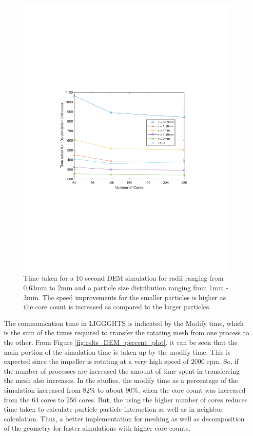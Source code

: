 \documentclass[preprint,11pt,authoryear]{elsarticle}
\begin{document}
\begin{figure}
\centering
\includegraphics[scale=0.85]{rslsts_DEM_alldia_timing_mtlb.pdf}
\caption{ Time taken for a 10 second DEM simulation for radii ranging from
 0.63mm to 2mm and a particle size distribution ranging from 1mm - 3mm. The speed improvements 
 for the smaller particles is higher as the core count is increased as compared to the larger particles.}
\label{fig:rslts_DEM_timing_studies}
\end{figure}

The communication time in LIGGGHTS is indicated by the Modify time, which is the sum of the 
times required to transfer the rotating mesh from one process to the other. From Figure 
\ref{fig:rslts_DEM_percent_plot}, it can be seen that the main portion of the simulation time is taken up by 
the modify time. This is expected since the impeller is rotating at a very high speed of 2000 rpm. So, if 
the number of processes are increased the amount of time spent in transferring the mesh also 
increases. In the studies, the modify time as a percentage of the simulation increased from 82\% to 
about 90\%, when the core count was increased from the 64 cores to 256 cores. But, the using the 
higher number of cores reduces time taken to calculate particle-particle interaction as well as in 
neighbor calculation. Thus, a better implementation for meshing as well as decomposition of the 
geometry for faster simulations with higher core counts.
\end{document}
